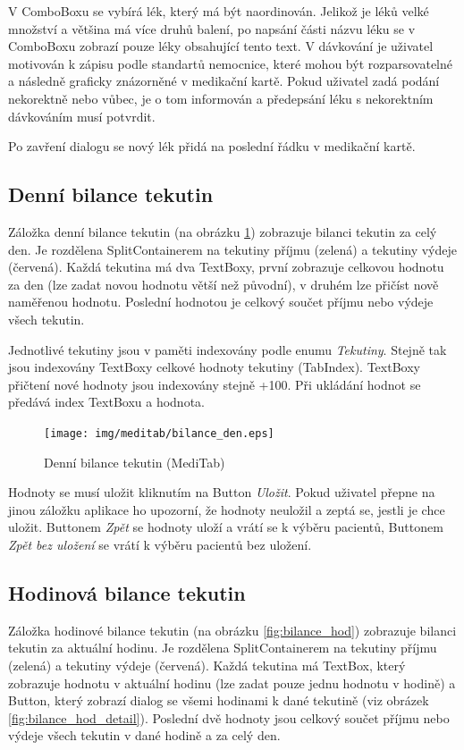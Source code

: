 V ComboBoxu se vybírá lék, který má být naordinován. Jelikož je léků velké množství a většina má více druhů balení, po napsání části názvu léku se v ComboBoxu zobrazí pouze léky obsahující tento text. V dávkování je uživatel motivován k zápisu podle standartů nemocnice, které mohou být rozparsovatelné a následně graficky znázorněné v medikační kartě. Pokud uživatel zadá podání nekorektně nebo vůbec, je o tom informován a předepsání léku s nekorektním dávkováním musí potvrdit.

Po zavření dialogu se nový lék přidá na poslední řádku v medikační kartě.


\subsection{Denní bilance tekutin}

Záložka denní bilance tekutin (na obrázku \ref{fig:bilance_den}) zobrazuje bilanci tekutin za celý den. Je rozdělena SplitContainerem na tekutiny příjmu (zelená) a tekutiny výdeje (červená). Každá tekutina má dva TextBoxy, první zobrazuje celkovou hodnotu za den (lze zadat novou hodnotu větší než původní), v druhém lze přičíst nově naměřenou hodnotu. Poslední hodnotou je celkový součet příjmu nebo výdeje všech tekutin.

Jednotlivé tekutiny jsou v paměti indexovány podle enumu \emph{Tekutiny}. Stejně tak jsou indexovány TextBoxy celkové hodnoty tekutiny (TabIndex). TextBoxy přičtení nové hodnoty jsou indexovány stejně +100. Při ukládání hodnot se předává index TextBoxu a hodnota.

\begin{figure}[H]
	\centering
	\texttt{[image: img/meditab/bilance\_den.eps]}
	\caption{Denní bilance tekutin (MediTab)}
  \label{fig:bilance_den}
\end{figure}

Hodnoty se musí uložit kliknutím na Button \emph{Uložit}. Pokud uživatel přepne na jinou záložku aplikace ho upozorní, že hodnoty neuložil a zeptá se, jestli je chce uložit. Buttonem \emph{Zpět} se hodnoty uloží a vrátí se k výběru pacientů, Buttonem \emph{Zpět bez uložení} se vrátí k výběru pacientů bez uložení.

\subsection{Hodinová bilance tekutin}

Záložka hodinové bilance tekutin (na obrázku \ref{fig:bilance_hod}) zobrazuje bilanci tekutin za aktuální hodinu. Je rozdělena SplitContainerem na tekutiny příjmu (zelená) a tekutiny výdeje (červená). Každá tekutina má TextBox, který zobrazuje hodnotu v aktuální hodinu (lze zadat pouze jednu hodnotu v hodině) a Button, který zobrazí dialog se všemi hodinami k dané tekutině (viz obrázek \ref{fig:bilance_hod_detail}). Poslední dvě hodnoty jsou celkový součet příjmu nebo výdeje všech tekutin v dané hodině a za celý den.

